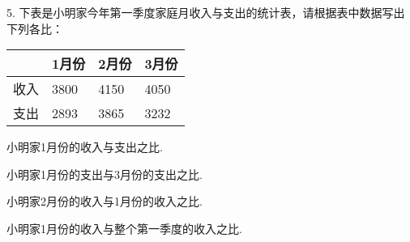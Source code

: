 5. 下表是小明家今年第一季度家庭月收入与支出的统计表，请根据表中数据写出下列各比：

\begin{center}

    \begin{tabular}{|p{2.5cm}<{\centering}|p{2.5cm}<{\centering}|p{2.5cm}<{\centering}|p{2.5cm}<{\centering}|}

         \hline

         &1月份&2月份&3月份 \\

         \hline

        收入&3800&4150&4050 \\

        \hline

        支出&2893&3865&3232 \\

        \hline

    \end{tabular}

\end{center}

\begin{subquestions}

    \subquestion 小明家1月份的收入与支出之比. 

    \subquestion 小明家1月份的支出与3月份的支出之比.   

    \subquestion 小明家2月份的收入与1月份的收入之比.   

    \subquestion 小明家1月份的收入与整个第一季度的收入之比.

\end{subquestions}

  



